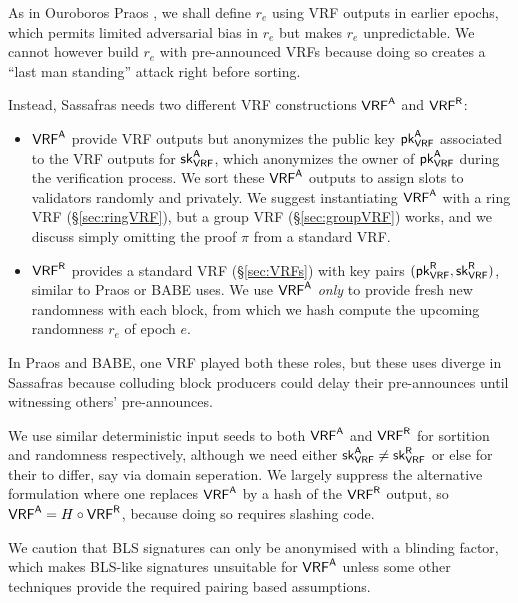 As in Ouroboros Praos \cite{Praos}, we shall define $r_e$ using VRF outputs in earlier epochs, which permits limited adversarial bias in $r_e$ but makes $r_e$ unpredictable.  We cannot however build $r_e$ with pre-announced VRFs because doing so creates a ``last man standing'' attack right before sorting.  

Instead, Sassafras needs two different VRF constructions $\mathsf{VRF}^{\mathsf{A}}$ and $\mathsf{VRF}^{\mathsf{R}}$:
\begin{itemize}
\item
$\mathsf{VRF}^{\mathsf{A}}$ provide VRF outputs but anonymizes the public key $\mathsf{pk}_{\mathsf{VRF}}^{\mathsf{A}}$ associated to the VRF outputs for $\mathsf{sk}_{\mathsf{VRF}}^{\mathsf{A}}$, which anonymizes the owner of $\mathsf{pk}_{\mathsf{VRF}}^{\mathsf{A}}$ during the verification process.  We sort these $\mathsf{VRF}^{\mathsf{A}}$ outputs to assign slots to validators randomly and privately.  We suggest instantiating $\mathsf{VRF}^{\mathsf{A}}$ with a ring VRF (\S\ref{sec:ringVRF}), but a group VRF (\S\ref{sec:groupVRF}) works, and we discuss simply omitting the proof $\pi$ from a standard VRF.
\item
$\mathsf{VRF}^{\mathsf{R}}$ provides a standard VRF (\S\ref{sec:VRFs}) with key pairs $(\mathsf{pk}_{\mathsf{VRF}}^{\mathsf{R}},\mathsf{sk}_{\mathsf{VRF}}^{\mathsf{R}})$, similar to Praos or BABE uses.  We use $\mathsf{VRF}^{\mathsf{A}}$ \emph{only} to provide fresh new randomness with each block, from which we hash compute the upcoming randomness $r_e$ of epoch $e$.  
\end{itemize}
In Praos and BABE, one VRF played both these roles, but these uses diverge in Sassafras because colluding block producers could delay their pre-announces until witnessing others' pre-announces.  


We use similar deterministic input seeds to both $\mathsf{VRF}^{\mathsf{A}}$ and $\mathsf{VRF}^{\mathsf{R}}$ for sortition and randomness respectively, although we need either $\mathsf{sk}_{\mathsf{VRF}}^{\mathsf{A}} \ne \mathsf{sk}_{\mathsf{VRF}}^{\mathsf{R}}$ or else for their to differ, say via domain seperation.  
We largely suppress the alternative formulation where one replaces $\mathsf{VRF}^{\mathsf{A}}$ by a hash of the $\mathsf{VRF}^{\mathsf{R}}$ output, so $\mathsf{VRF}^{\mathsf{A}} = H \circ \mathsf{VRF}^{\mathsf{R}}$, because doing so requires slashing code.

We caution that BLS signatures can only be anonymised with a blinding factor, which makes BLS-like signatures unsuitable for $\mathsf{VRF}^{\mathsf{A}}$ unless some other techniques provide the required pairing based assumptions.

